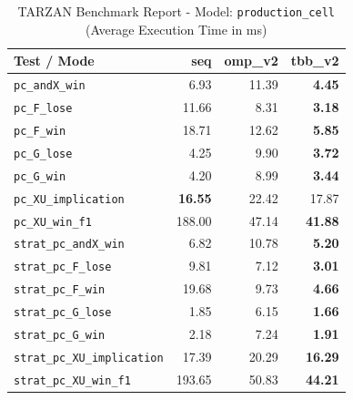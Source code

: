 \begin{table}[htbp]
\centering
\caption{TARZAN Benchmark Report - Model: \texttt{production\_cell} (Average Execution Time in ms)}
\label{tab:production_cell_benchmark}
\begin{tabular}{lrrr}
\toprule
\textbf{Test / Mode} & \textbf{seq} & \textbf{omp\_v2} & \textbf{tbb\_v2} \\
\midrule
\texttt{pc\_andX\_win} & 6.93 & 11.39 & \textbf{4.45} \\
\texttt{pc\_F\_lose} & 11.66 & 8.31 & \textbf{3.18} \\
\texttt{pc\_F\_win} & 18.71 & 12.62 & \textbf{5.85} \\
\texttt{pc\_G\_lose} & 4.25 & 9.90 & \textbf{3.72} \\
\texttt{pc\_G\_win} & 4.20 & 8.99 & \textbf{3.44} \\
\texttt{pc\_XU\_implication} & \textbf{16.55} & 22.42 & 17.87 \\
\texttt{pc\_XU\_win\_f1} & 188.00 & 47.14 & \textbf{41.88} \\
\texttt{strat\_pc\_andX\_win} & 6.82 & 10.78 & \textbf{5.20} \\
\texttt{strat\_pc\_F\_lose} & 9.81 & 7.12 & \textbf{3.01} \\
\texttt{strat\_pc\_F\_win} & 19.68 & 9.73 & \textbf{4.66} \\
\texttt{strat\_pc\_G\_lose} & 1.85 & 6.15 & \textbf{1.66} \\
\texttt{strat\_pc\_G\_win} & 2.18 & 7.24 & \textbf{1.91} \\
\texttt{strat\_pc\_XU\_implication} & 17.39 & 20.29 & \textbf{16.29} \\
\texttt{strat\_pc\_XU\_win\_f1} & 193.65 & 50.83 & \textbf{44.21} \\
\bottomrule
\end{tabular}
\end{table}